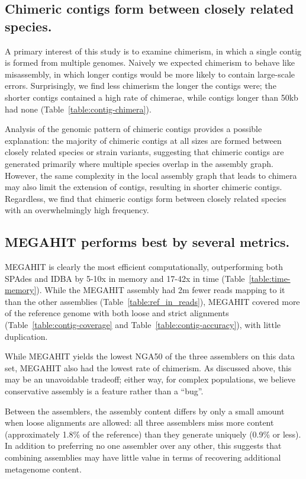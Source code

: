 \documentclass[10pt,a4paper,twocolumn]{article}
\begin{document}

\subsection*{Chimeric contigs form between closely related species.}

A primary interest of this study is to examine chimerism, in which a
single contig is formed from multiple genomes.  Naively we expected
chimerism to behave like misassembly, in which longer contigs would be
more likely to contain large-scale errors.  Surprisingly, we find
less chimerism the longer the contigs were; the shorter contigs
contained a high rate of chimerae, while contigs longer than 50kb had
none (Table~\ref{table:contig-chimera}).

Analysis of the genomic pattern of chimeric contigs provides a possible
explanation: the majority of chimeric contigs at all sizes are formed
between closely related species or strain variants, suggesting that
chimeric contigs are generated primarily where multiple species
overlap in the assembly graph.  However, the same complexity in the
local assembly graph that leads to chimera may also limit the
extension of contigs, resulting in shorter chimeric contigs.
Regardless, we find that chimeric contigs form between closely
related species with an overwhelmingly high frequency.

\subsection*{MEGAHIT performs best by several metrics.}

MEGAHIT is clearly the most efficient computationally, outperforming
both SPAdes and IDBA by 5-10x in memory and 17-42x in time
(Table~\ref{table:time-memory}).  While the MEGAHIT assembly had 2m
fewer reads mapping to it than the other assemblies (Table~\ref{table:ref_in_reads}), MEGAHIT
covered more of the reference genome with both loose and strict
alignments (Table~\ref{table:contig-coverage} and
Table~\ref{table:contig-accuracy}), with little duplication.

While MEGAHIT yields the lowest NGA50 of the three assemblers on this
data set, MEGAHIT also had the lowest rate of chimerism.  As discussed
above, this may be an unavoidable tradeoff; either way, for complex
populations, we believe conservative assembly is a feature rather than
a ``bug''.

Between the assemblers, the assembly content differs by only a small
amount when loose alignments are allowed: all three assemblers miss
more content (approximately 1.8\% of the reference) than they generate
uniquely (0.9\% or less).  In addition to preferring no one assembler
over any other, this suggests that combining assemblies may have
little value in terms of recovering additional metagenome content.
\end{document}
